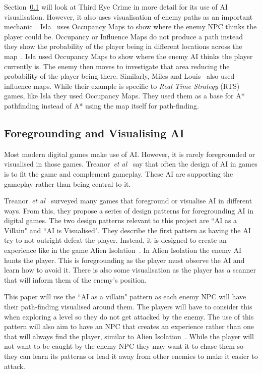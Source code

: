 \documentclass[journal]{IEEEtran}
\begin{document}
Section~\ref{VisualisingAI} will look at Third Eye Crime in more detail for its use of AI visualisation. However, it also uses visualisation of enemy paths as an important mechanic~\cite{Isla2014, game:ThirdEyeCrime}.  Isla~\cite{Isla2014} uses Occupancy Maps to show where the enemy NPC thinks the player could be. Occupancy or Influence Maps do not produce a path instead they show the probability of the player being in different locations across the map~\cite{Isla2014, Miles2006}. Isla used Occupancy Maps to show where the enemy AI thinks the player currently is. The enemy then moves to investigate that area reducing the probability of the player being there.  Similarly, Miles and Louis~\cite{Miles2006} also used influence maps. While their example is specific to \textit{Real Time Strategy} (RTS) games, like Isla they used Occupancy Maps.  They used them as a base for A* pathfinding instead of A* using the map itself for path-finding.


\subsection{Foregrounding and Visualising AI} \label{VisualisingAI}
Most modern digital games make use of AI.  However, it is rarely foregrounded or visualised in those games. Treanor~\textit{et al}~\cite{treanor2015} say that often the design of AI in games is to fit the game and complement gameplay. These AI are supporting the gameplay rather than being central to it.

Treanor~\textit{et al}~\cite{treanor2015} surveyed many games that foreground or visualise AI in different ways.   From this, they propose a series of design patterns for foregrounding AI in digital games. 
The two design patterns relevant to this project are ``AI as a Villain" and ``AI is Visualised".  They describe the first pattern as having the AI try to not outright defeat the player. Instead, it is designed to create an experience like in the game Alien Isolation~\cite{treanor2015, game:AlienIsolation}.  In Alien Isolation the enemy AI hunts the player. This is foregrounding as the player must observe the AI and learn how to avoid it. There is also some visualisation as the player has a scanner that will inform them of the enemy's position. 

This paper will use the ``AI as a villain" pattern as each enemy NPC will have their path-finding visualised around them. The players will have to consider this when exploring a level so they do not get attacked by the enemy. The use of this pattern will also aim to have an NPC that creates an experience rather than one that will always find the player, similar to Alien Isolation~\cite{game:AlienIsolation,treanor2015}. While the player will not want to be caught by the enemy NPC they may want it to chase them so they can learn its patterns or lead it away from other enemies to make it easier to attack. 
\end{document}
